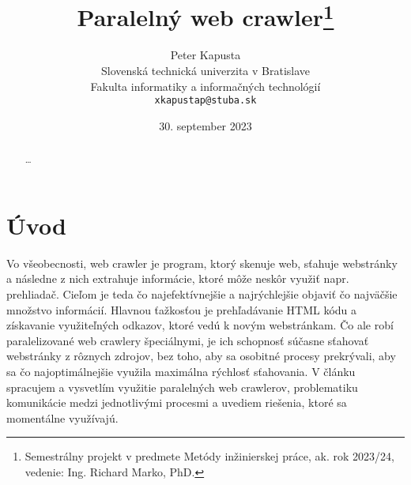 \documentclass[10pt,twoside,slovak,a4paper]{article}
\title{Paralelný web crawler\thanks{Semestrálny projekt v predmete Metódy inžinierskej práce, ak. rok 2023/24, vedenie: Ing. Richard Marko, PhD.}}
\author{Peter Kapusta\\[2pt]
	{\small Slovenská technická univerzita v Bratislave}\\
	{\small Fakulta informatiky a informačných technológií}\\
	{\small \texttt{xkapustap@stuba.sk}}}
\date{\small 30. september 2023} %
\begin{document}
\maketitle

\begin{abstract}
\ldots
\end{abstract}

\section{Úvod}

Vo všeobecnosti, web crawler je program, ktorý skenuje web, sťahuje webstránky a následne z nich extrahuje informácie, ktoré môže neskôr využiť napr. prehliadač. Cieľom je teda čo najefektívnejšie a najrýchlejšie objaviť čo najväčšie množstvo informácií. Hlavnou ťažkosťou je prehľadávanie HTML kódu a získavanie využiteľných odkazov, ktoré vedú k novým webstránkam. Čo ale robí paralelizované web crawlery špeciálnymi, je ich schopnosť súčasne sťahovať webstránky z rôznych zdrojov, bez toho, aby sa osobitné procesy prekrývali, aby sa čo najoptimálnejšie využila maximálna rýchlosť sťahovania. V článku spracujem a vysvetlím využitie paralelných web crawlerov, problematiku komunikácie medzi jednotlivými procesmi a uvediem riešenia, ktoré sa momentálne využívajú.

%
%
\end{document}
